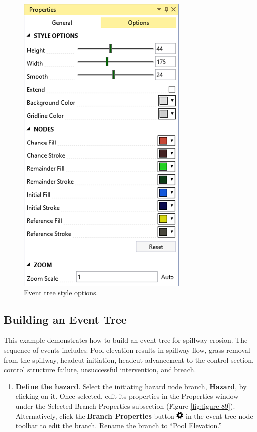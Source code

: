 \documentclass[
]{book}
\providecommand{\tightlist}{%
  \setlength{\itemsep}{0pt}\setlength{\parskip}{0pt}}
\begin{document}
\begin{figure}

{\centering \includegraphics{images/figure88} 

}

\caption{Event tree style options.}\label{fig:figure-88}
\end{figure}

\hypertarget{building-an-event-tree}{%
\subsection{Building an Event Tree}\label{building-an-event-tree}}

This example demonstrates how to build an event tree for spillway erosion. The sequence of events includes: Pool elevation results in spillway flow, grass removal from the spillway, headcut initiation, headcut advancement to the control section, control structure failure, unsuccessful intervention, and breach.

\begin{enumerate}
\def\labelenumi{\arabic{enumi}.}
\tightlist
\item
  \textbf{Define the hazard}. Select the initiating hazard node branch, \textbf{Hazard}, by clicking on it. Once selected, edit its properties in the Properties window under the Selected Branch Properties subsection (Figure \ref{fig:figure-89}). Alternatively, click the \textbf{Branch Properties} button \includegraphics{images/branchproperties.png} in the event tree node toolbar to edit the branch. Rename the branch to ``Pool Elevation.''
\end{enumerate}
\end{document}
